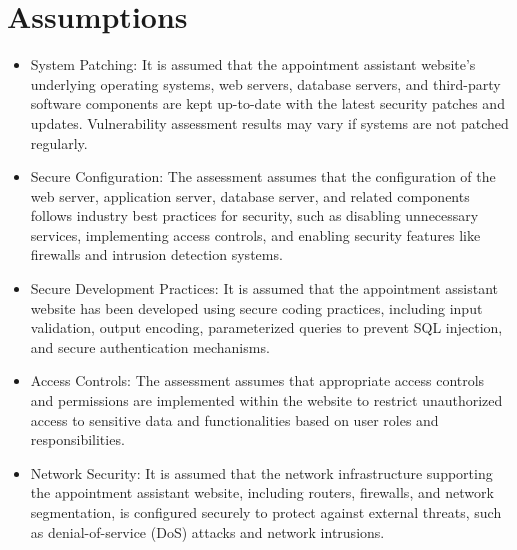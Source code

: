 \documentclass[openany]{report}
\begin{document}
\section{Assumptions}
\begin{itemize}
    \item System Patching: It is assumed that the appointment assistant website's underlying operating systems, web servers, database servers, and third-party software components are kept up-to-date with the latest security patches and updates. Vulnerability assessment results may vary if systems are not patched regularly.
    \item Secure Configuration: The assessment assumes that the configuration of the web server, application server, database server, and related components follows industry best practices for security, such as disabling unnecessary services, implementing access controls, and enabling security features like firewalls and intrusion detection systems.
    \item Secure Development Practices: It is assumed that the appointment assistant website has been developed using secure coding practices, including input validation, output encoding, parameterized queries to prevent SQL injection, and secure authentication mechanisms.
    \item Access Controls: The assessment assumes that appropriate access controls and permissions are implemented within the website to restrict unauthorized access to sensitive data and functionalities based on user roles and responsibilities.
    \item Network Security: It is assumed that the network infrastructure supporting the appointment assistant website, including routers, firewalls, and network segmentation, is configured securely to protect against external threats, such as denial-of-service (DoS) attacks and network intrusions.
\end{itemize}
\end{document}
